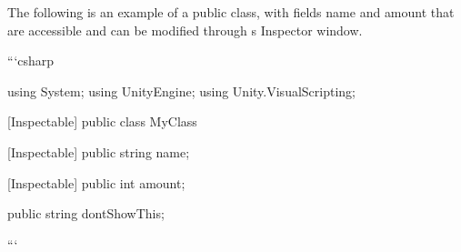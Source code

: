 The following is an example of a public class, with fields {\ttfamily name} and {\ttfamily amount} that are accessible and can be modified through \textquotesingle{}s Inspector window. \begin{DoxyVerb}```csharp

using System;
using UnityEngine; 
using Unity.VisualScripting;

[Inspectable]
public class MyClass
{
    [Inspectable]
    public string name;

    [Inspectable]
    public int amount;

    public string dontShowThis;
}

```
\end{DoxyVerb}
 